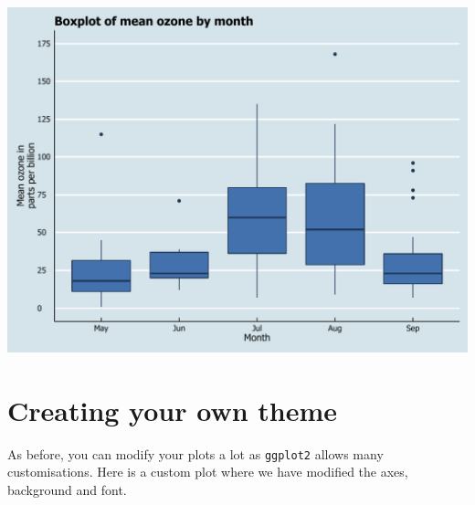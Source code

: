 \begin{center}\includegraphics[width=0.55\linewidth]{figures/box_12-1} \end{center}

\section{Creating your own theme}\label{creating-your-own-theme-9}

As before, you can modify your plots a lot as \texttt{ggplot2} allows
many customisations. Here is a custom plot where we have modified the
axes, background and font.

